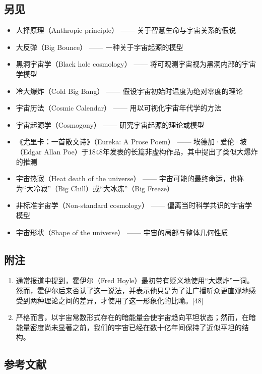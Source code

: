 \subsection{另见}
\begin{itemize}
\item 人择原理（Anthropic principle） —— 关于智慧生命与宇宙关系的假说  
\item 大反弹（Big Bounce） —— 一种关于宇宙起源的模型  
\item 黑洞宇宙学（Black hole cosmology） —— 将可观测宇宙视为黑洞内部的宇宙学模型  
\item 冷大爆炸（Cold Big Bang） —— 假设宇宙初始时温度为绝对零度的理论  
\item 宇宙历法（Cosmic Calendar） —— 用以可视化宇宙年代学的方法  
\item 宇宙起源学（Cosmogony） —— 研究宇宙起源的理论或模型  
\item 《尤里卡：一首散文诗》（Eureka: A Prose Poem） —— 埃德加·爱伦·坡（Edgar Allan Poe）于1848年发表的长篇非虚构作品，其中提出了类似大爆炸的推测  
\item 宇宙热寂（Heat death of the universe） —— 宇宙可能的最终命运，也称为“大冷寂”（Big Chill）或“大冰冻”（Big Freeze）  
\item 非标准宇宙学（Non-standard cosmology） —— 偏离当时科学共识的宇宙学模型  
\item 宇宙形状（Shape of the universe） —— 宇宙的局部与整体几何性质  
\end{itemize}
\subsection{附注}
\begin{enumerate}
\item 通常报道中提到，霍伊尔（Fred Hoyle）最初带有贬义地使用“大爆炸”一词。然而，霍伊尔后来否认了这一说法，并表示他只是为了让广播听众更直观地感受到两种理论之间的差异，才使用了这一形象化的比喻。[48]
\item 严格而言，以宇宙常数形式存在的暗能量会使宇宙趋向平坦状态；然而，在暗能量密度尚未显著之前，我们的宇宙已经在数十亿年间保持了近似平坦的结构。
\end{enumerate}
\subsection{参考文献 }
